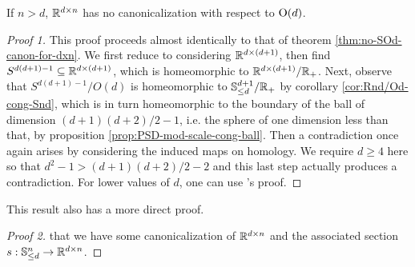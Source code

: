 \begin{theorem}\label{thm:no-Od-canon-for-dxn}
    If $n > d$, $\mathbb{R}^{d \times n}$ has no canonicalization with respect to $\operatorname{O}(d)$.
    \begin{proof}[Proof 1]
        This proof proceeds almost identically to that of theorem \ref{thm:no-SOd-canon-for-dxn}.
        We first reduce to considering $\mathbb{R}^{d \times (d+1)}$, then find $S^{d(d+1) - 1} \subseteq \mathbb{R}^{d \times (d+1)}$, which is homeomorphic to $\mathbb{R}^{d \times (d+1)} / \mathbb{R}_+$.
        Next, observe that $S^{d(d+1) - 1}/O(d)$ is homeomorphic to $\mathbb{S}^{d+1}_{\leq d}/\mathbb{R}_+$ by corollary \ref{cor:Rnd/Od-cong-Snd}, which is in turn homeomorphic to the boundary of the ball of dimension $(d+1)(d+2)/2 - 1$, i.e. the sphere of one dimension less than that, by proposition \ref{prop:PSD-mod-scale-cong-ball}.
        Then a contradiction once again arises by considering the induced maps on homology.
        We require $d \geq 4$ here so that $d^2 - 1 > (d+1)(d+2)/2 - 2$ and this last step actually produces a contradiction.
        For lower values of $d$, one can use \cite{dym2024equivariant}'s proof.
    \end{proof}
    This result also has a more direct proof.
    \begin{proof}[Proof 2]
        \Afsoc that we have some canonicalization of $\mathbb{R}^{d \times n}$ and the associated section $s : \mathbb{S}^n_{\leq d} \to \mathbb{R}^{d \times n}$.
    \end{proof}
\end{theorem}

